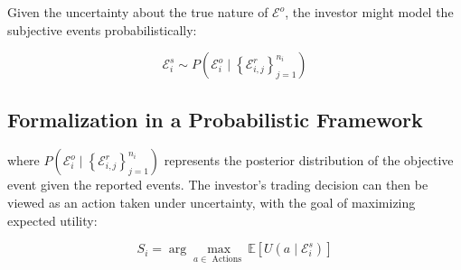 \documentclass[12pt,article]{memoir}
\begin{document}
Given the uncertainty about the true nature of $\mathcal{E}^o$, the investor might model the subjective events probabilistically:

$$
\mathcal{E}_i^s \sim P\left(\mathcal{E}_i^o \mid\left\{\mathcal{E}_{i, j}^r\right\}_{j=1}^{n_i}\right)
$$
\subsection{ Formalization in a Probabilistic Framework}
where $P\left(\mathcal{E}_i^o \mid\left\{\mathcal{E}_{i, j}^r\right\}_{j=1}^{n_i}\right)$ represents the posterior distribution of the objective event given the reported events. The investor's trading decision can then be viewed as an action taken under uncertainty, with the goal of maximizing expected utility:

$$
S_i=\arg \max _{a \in \text { Actions }} \mathbb{E}\left[U\left(a \mid \mathcal{E}_i^s\right)\right]
$$
\end{document}
